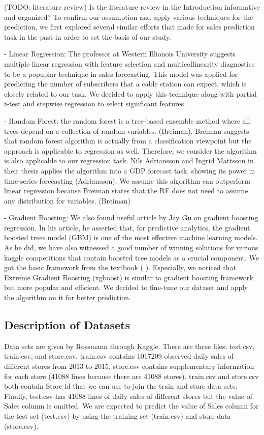 \documentclass[letterpaper,twocolumn,10pt]{article}
\begin{document}
(TODO: literature review) Is the literature review in the Introduction informative and organized?
To confirm our assumption and apply various techniques for the prediction, we first explored several similar efforts that made for sales prediction task in the past in order to set the basis of our study. 

- Linear Regression: The professor at Western Illionois University suggests multiple linear regression with feature selection and multicollinearity diagnostics to be a popuplar technique in sales forecasting. This model was applied for predicting the number of subscribers that a cable station can expect, which is closely related to our task. We decided to apply this technique along with partial t-test and stepwise regression to select significant features. 

- Random Forest: the random forest is a tree-based ensemble method where all trees depend on a collection of random variables. (Breiman). Breiman suggests that random forest algorithm is actually from a classification viewpoint but the approach is
applicable to regression as well. Therefore, we consider the algorithm is also applicable to our regression task. Nils Adriansson and Ingrid Mattsson in their thesis applies the algorithm into a GDP forecast task, showing its power in time-series forecasting (Adriansson). We assume this algorithm can outperform linear regression because Breiman states that the RF does not need to assume any distribution for variables. (Breiman)

- Gradient Boosting: We also found useful article by Jay Gu on gradient boosting regression. In his article, he asserted that, for predictive analytics, the gradient boosted trees model (GBM) is one of the most effective machine learning models. As he did, we have also witnessed a good number of winning solutions for various kaggle competitions that contain boosted tree models as a crucial component. We got the basic framework from the textbook (    ). Especially, we noticed that Extreme Gradient Boosting (xgboost) is similar to gradient boosting framework but more popular and efficient. We decided to fine-tune our dataset and apply the algorithm on it for better prediction.


\subsection{Description of Datasets}
Data sets are given by Rossmann through Kaggle. There are three files: test.csv, train.csv, and store.csv. train.csv contains 1017209 observed daily sales of different stores from 2013 to 2015. store.csv contains supplementary information for each store (41088 lines because there are 41088 stores). train.csv and store.csv both contain Store id that we can use to join the train and store data sets. Finally, test.csv has 41088 lines of daily sales of different stores but the value of Sales column is omitted. We are expected to predict the value of Sales column for the test set (test.csv) by using the training set (train.csv) and store data (store.csv).
\end{document}
